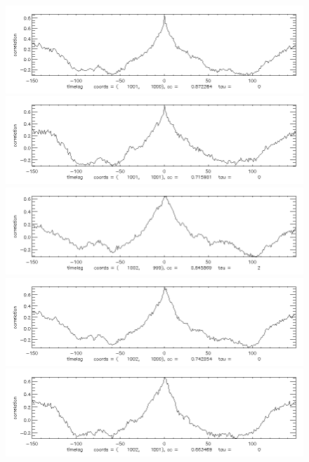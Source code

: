 \documentclass[12pt]{article}
\begin{document}
\begin{figure}[here]
\includegraphics[width=7in]{cc21.png}
\includegraphics[width=7in]{cc22.png}
\includegraphics[width=7in]{cc23.png}
\includegraphics[width=7in]{cc24.png}
\includegraphics[width=7in]{cc25.png}
\end{figure}
\newpage
\end{document}
